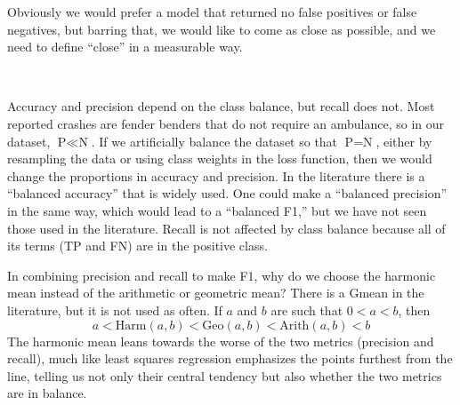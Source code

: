 \vskip 12pt

Obviously we would prefer a model that returned no false positives or false negatives, but barring that, we would like to come as close as possible, and we need to define ``close'' in a measurable way.  

\

\hfil{}

\vskip 12pt

Accuracy and precision depend on the class balance, but recall does not.  Most reported crashes are fender benders that do not require an ambulance, so in our dataset, $\text{P} \ll \text{N}$.  If we artificially balance the dataset so that $\text{P} = \text{N}$, either by resampling the data or using class weights in the loss function, then we would change the proportions in accuracy and precision.  In the literature there is a ``balanced accuracy'' that is widely used.  One could make a ``balanced precision'' in the same way, which would lead to a ``balanced F1,'' but we have not seen those used in the literature.  Recall is not affected by class balance because all of its terms (TP and FN) are in the positive class.  

In combining precision and recall to make F1, why do we choose the harmonic mean instead of the arithmetic or geometric mean?  There is a Gmean in the literature, but it is not used as often.    If $a$ and $b$ are such that $0 < a < b$, then $$a < \text{Harm}(a,b) < \text{Geo}(a,b) < \text{Arith}(a,b) < b$$    The harmonic mean leans towards the worse of the two metrics (precision and recall), much like least squares regression emphasizes the points furthest from the line, telling us not only their central tendency but also whether the two metrics are in balance.
  

